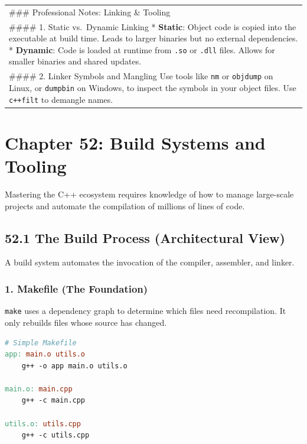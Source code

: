 \begin{longtable}[]{@{}
  >{\raggedright\arraybackslash}p{}@{}}
\toprule
\endhead
\#\#\# Professional Notes: Linking \& Tooling \\
\#\#\#\# 1. Static vs.~Dynamic Linking * \textbf{Static}: Object code is
copied into the executable at build time. Leads to larger binaries but
no external dependencies. * \textbf{Dynamic}: Code is loaded at runtime
from \passthrough{\lstinline!.so!} or \passthrough{\lstinline!.dll!}
files. Allows for smaller binaries and shared updates. \\
\#\#\#\# 2. Linker Symbols and Mangling Use tools like
\passthrough{\lstinline!nm!} or \passthrough{\lstinline!objdump!} on
Linux, or \passthrough{\lstinline!dumpbin!} on Windows, to inspect the
symbols in your object files. Use \passthrough{\lstinline!c++filt!} to
demangle names. \\
\bottomrule
\end{longtable}

\hypertarget{chapter-52-build-systems-and-tooling}{%
\section{Chapter 52: Build Systems and
Tooling}\label{chapter-52-build-systems-and-tooling}}

Mastering the C++ ecosystem requires knowledge of how to manage
large-scale projects and automate the compilation of millions of lines
of code.

\hypertarget{the-build-process-architectural-view}{%
\subsection{52.1 The Build Process (Architectural
View)}\label{the-build-process-architectural-view}}

A build system automates the invocation of the compiler, assembler, and
linker.

\hypertarget{makefile-the-foundation}{%
\subsubsection{1. Makefile (The
Foundation)}\label{makefile-the-foundation}}

\passthrough{\lstinline!make!} uses a dependency graph to determine
which files need recompilation. It only rebuilds files whose source has
changed.

\begin{lstlisting}[language=make]
# Simple Makefile
app: main.o utils.o
    g++ -o app main.o utils.o

main.o: main.cpp
    g++ -c main.cpp

utils.o: utils.cpp
    g++ -c utils.cpp
\end{lstlisting}

